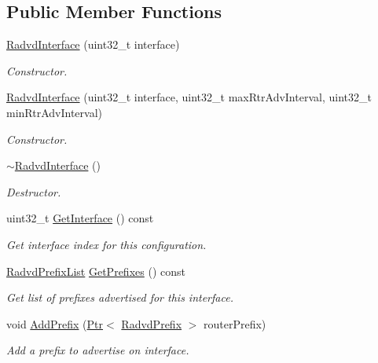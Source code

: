 \subsection*{Public Member Functions}
\begin{DoxyCompactItemize}
\item 
\hyperlink{classns3_1_1RadvdInterface_a0051e60eec1caedff0c7519ef72325a3}{Radvd\+Interface} (uint32\+\_\+t interface)
\begin{DoxyCompactList}\small\item\em Constructor. \end{DoxyCompactList}\item 
\hyperlink{classns3_1_1RadvdInterface_ac93d5a7551c1edbfe71158eb5c64e2cd}{Radvd\+Interface} (uint32\+\_\+t interface, uint32\+\_\+t max\+Rtr\+Adv\+Interval, uint32\+\_\+t min\+Rtr\+Adv\+Interval)
\begin{DoxyCompactList}\small\item\em Constructor. \end{DoxyCompactList}\item 
\hyperlink{classns3_1_1RadvdInterface_a294dc04119765497a2d27d8f5eb343f6}{$\sim$\+Radvd\+Interface} ()
\begin{DoxyCompactList}\small\item\em Destructor. \end{DoxyCompactList}\item 
uint32\+\_\+t \hyperlink{classns3_1_1RadvdInterface_a11cc87a3de7761813d9a1f246c9425b7}{Get\+Interface} () const 
\begin{DoxyCompactList}\small\item\em Get interface index for this configuration. \end{DoxyCompactList}\item 
\hyperlink{classns3_1_1RadvdInterface_a25f72232730563f395b822cf912e9f5e}{Radvd\+Prefix\+List} \hyperlink{classns3_1_1RadvdInterface_acc911a42ab3045d779ea480ccc365a1b}{Get\+Prefixes} () const 
\begin{DoxyCompactList}\small\item\em Get list of prefixes advertised for this interface. \end{DoxyCompactList}\item 
void \hyperlink{classns3_1_1RadvdInterface_a5a6fdd4d44fac7d8aa261abf701955d6}{Add\+Prefix} (\hyperlink{classns3_1_1Ptr}{Ptr}$<$ \hyperlink{classns3_1_1RadvdPrefix}{Radvd\+Prefix} $>$ router\+Prefix)
\begin{DoxyCompactList}\small\item\em Add a prefix to advertise on interface. \end{DoxyCompactList}\item 

\end{DoxyCompactItemize}
